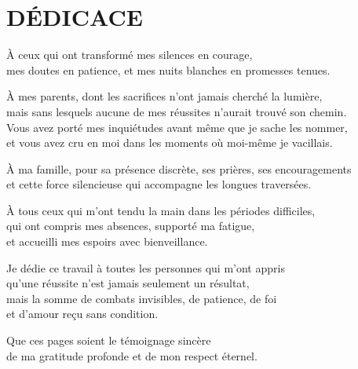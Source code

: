 
\clearpage
\thispagestyle{empty}
\chapter*{DÉDICACE}
\vspace*{0.8cm}
\begin{center}
\itshape

À ceux qui ont transformé mes silences en courage,\\
mes doutes en patience, et mes nuits blanches en promesses tenues.

\vspace{0.9cm}

À mes parents, dont les sacrifices n'ont jamais cherché la lumière,\\
mais sans lesquels aucune de mes réussites n'aurait trouvé son chemin.\\
Vous avez porté mes inquiétudes avant même que je sache les nommer,\\
et vous avez cru en moi dans les moments où moi-même je vacillais.

\vspace{0.9cm}

À ma famille, pour sa présence discrète, ses prières, ses encouragements\\
et cette force silencieuse qui accompagne les longues traversées.

\vspace{0.9cm}

À tous ceux qui m'ont tendu la main dans les périodes difficiles,\\
qui ont compris mes absences, supporté ma fatigue,\\
et accueilli mes espoirs avec bienveillance.

\vspace{0.9cm}

Je dédie ce travail à toutes les personnes qui m'ont appris\\
qu'une réussite n'est jamais seulement un résultat,\\
mais la somme de combats invisibles, de patience, de foi\\
et d'amour reçu sans condition.

\vspace{1cm}

Que ces pages soient le témoignage sincère\\
de ma gratitude profonde et de mon respect éternel.

\end{center}
\vspace*{\fill}
